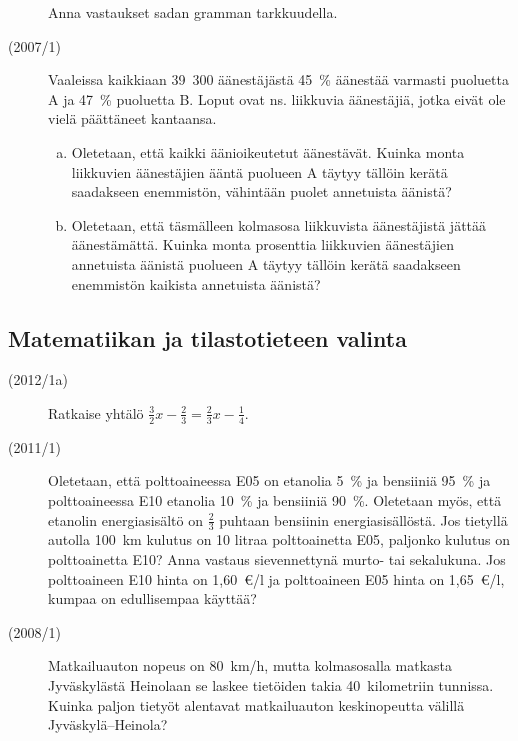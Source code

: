\begin{description}
    	Anna vastaukset sadan gramman tarkkuudella.

	\item[(2007/1)] Vaaleissa kaikkiaan 39~300 äänestäjästä 45~\% äänestää varmasti
        puoluetta A ja 47~\% puoluetta B. Loput ovat ns. liikkuvia äänestäjiä,
        jotka eivät ole vielä päättäneet kantaansa.
	
    	\begin{enumerate}[(a)]
    		\item Oletetaan, että kaikki äänioikeutetut äänestävät. Kuinka monta
                liikkuvien äänestäjien ääntä puolueen A täytyy tällöin kerätä
                saadakseen enemmistön, vähintään puolet annetuista äänistä?
    		\item Oletetaan, että täsmälleen kolmasosa liikkuvista äänestäjistä
                jättää äänestämättä. Kuinka monta prosenttia liikkuvien äänestäjien
                annetuista äänistä puolueen A täytyy tällöin kerätä saadakseen 
    		    enemmistön kaikista annetuista äänistä?
    	\end{enumerate}	 	
	
\end{description}

\subsection{Matematiikan ja tilastotieteen valinta}

\begin{description}
	\item[(2012/1a)] Ratkaise yhtälö $\frac{3}{2}x - \frac{2}{3} = \frac{2}{3}x - \frac{1}{4}$.
	\item[(2011/1)] Oletetaan, että polttoaineessa E05 on etanolia 5~\% ja
        bensiiniä 95~\% ja polttoaineessa E10 etanolia 10~\% ja bensiiniä 90~\%.
        Oletetaan myös, että etanolin energiasisältö on $\frac{2}{3}$ puhtaan bensiinin
		energiasisällöstä. Jos tietyllä autolla 100~km kulutus on 10 litraa
        polttoainetta E05, paljonko kulutus on polttoainetta E10? Anna vastaus
        sievennettynä murto- tai sekalukuna. Jos polttoaineen E10 hinta on 1,60~€/l
        ja polttoaineen E05 hinta on 1,65~€/l, kumpaa on edullisempaa käyttää?
	\item[(2008/1)] Matkailuauton nopeus on 80~km/h, mutta kolmasosalla matkasta
        Jyväskylästä Heinolaan se laskee tietöiden takia 40~kilometriin tunnissa.
        Kuinka paljon tietyöt alentavat matkailuauton keskinopeutta välillä Jyväskylä--Heinola?
\end{description}

